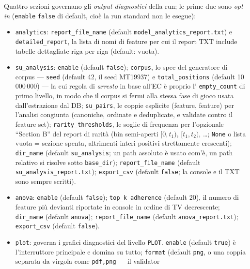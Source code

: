 Quattro sezioni governano gli \emph{output diagnostici} della run; le prime
due sono \emph{opt-in} (\texttt{enable} \texttt{false} di default, cioè la
run standard non le esegue):

\begin{itemize}
  \item \texttt{analytics}: \texttt{report\_file\_name} (default
        \texttt{model\_analytics\_report.txt}) e \texttt{detailed\_report},
        la lista di nomi di feature per cui il report TXT include tabelle
        dettagliate riga per riga (default: vuota).
  \item \texttt{su\_analysis}: \texttt{enable} (default
        \texttt{false}); \texttt{corpus}, lo spec del generatore di corpus —
        \texttt{seed} (default 42, il seed MT19937) e
        \texttt{total\_positions} (default 10\,000\,000) — la cui regola di
        \emph{arresto} in base all'EC è proprio l' \texttt{empty\_count} di
        primo livello, in modo che il corpus si fermi alla stessa fase di
        gioco usata dall'estrazione dal DB; \texttt{su\_pairs}, le coppie
        esplicite (feature, feature) per l'analisi congiunta (canoniche,
        ordinate e deduplicate, e validate contro il feature set);
        \texttt{rarity\_thresholds}, le soglie di frequenza per l'opzionale
        ``Section B'' del report di rarità (bin semi-aperti
        $[0,t_1)$, $[t_1,t_2)$, \ldots; \texttt{None} o lista vuota =
        sezione spenta, altrimenti interi positivi strettamente crescenti);
        \texttt{dir\_name} (default \texttt{su\_analysis}; un path assoluto
        è usato com'è, un path relativo si risolve sotto
        \texttt{base\_dir}); \texttt{report\_file\_name} (default
        \texttt{su\_analysis\_report.txt}); \texttt{export\_csv} (default
        \texttt{false}; la console e il TXT sono sempre scritti).
  \item \texttt{anova}: \texttt{enable} (default \texttt{false});
        \texttt{top\_k\_adherence} (default 20), il numero di feature più
        devianti riportate in console in ordine di TV decrescente;
        \texttt{dir\_name} (default \texttt{anova});
        \texttt{report\_file\_name} (default \texttt{anova\_report.txt});
        \texttt{export\_csv} (default \texttt{false}).
  \item \texttt{plot}: governa i grafici diagnostici del livello
        \texttt{PLOT}. \texttt{enable} (default \texttt{true}) è l'interruttore
        principale e domina su tutto; \texttt{format} (default \texttt{png},
        o una coppia separata da virgola come \texttt{pdf,png} — il validator

\end{itemize}
